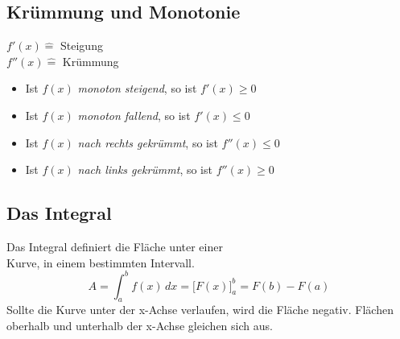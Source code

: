 \documentclass[a4paper, 15pt]{article}
\begin{document}
\subsection{Krümmung und Monotonie}
\begin{minipage}{.4\textwidth}
\begin{center}
$f'(x)\widehat{=}$ Steigung \\\vspace{.3cm}
$f''(x)\widehat{=}$ Krümmung \\\vspace{.5cm}
\end{center}
\end{minipage}
\hspace{1cm}
\begin{minipage}{.49\textwidth}
\begin{itemize}
\item Ist $f(x)$ \textit{monoton steigend}, so ist $f'(x)\geq 0$
\item Ist $f(x)$ \textit{monoton fallend}, so ist $f'(x)\leq 0$
\item Ist $f(x)$ \textit{nach rechts gekrümmt}, so ist $f''(x)\leq 0$
\item Ist $f(x)$ \textit{nach links gekrümmt}, so ist $f''(x)\geq 0$
\end{itemize}
\end{minipage}
\subsection{Das Integral}
\begin{minipage}{.45\textwidth}
Das Integral definiert die Fläche unter einer\\ Kurve, in einem bestimmten Intervall.
\begin{equation*}
A = \int_{a}^{b} f(x) \,dx = \biggl[F(x)\biggl]^b_a = F(b)-F(a)
\end{equation*}
Sollte die Kurve unter der x-Achse verlaufen, wird die Fläche negativ. Flächen oberhalb und unterhalb der x-Achse gleichen sich aus.
\end{minipage}
\hspace{1cm}
\begin{minipage}{.45\textwidth}
\begin{center}
\end{center}
\end{minipage}
\end{document}
